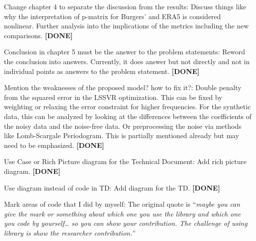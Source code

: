 \documentclass[a4paper,12pt]{scrreprt}
\begin{document}
\begin{numdesc}
    \item[Change chapter 4 to separate the discussion from the results:] Discuss things like why the interpretation of p-matrix for Burgers' and ERA5 is considered nonlinear. Further analysis into the implications of the metrics including the new comparisons. \textbf{[DONE]}
    \item[Conclusion in chapter 5 must be the answer to the problem statements:] Reword the conclusion into answers. Currently, it does answer but not directly and not in individual points as answers to the problem statement. \textbf{[DONE]}
    \item[Mention the weaknesses of the proposed model? how to fix it?:] Double penalty from the squared error in the LSSVR optimization. This can be fixed by weighting or relaxing the error constraint for higher frequencies. For the synthetic data, this can be analyzed by looking at the differences between the coefficients of the noisy data and the noise-free data. Or preprocessing the noise via methods like Lomb-Scargale Periodogram. This is partially mentioned already but may need to be emphasized. \textbf{[DONE]}
    \item[Use Case or Rich Picture diagram for the Technical Document:] Add rich picture diagram. \textbf{[DONE]}
    \item[Use diagram instead of code in TD:] Add diagram for the TD\@. \textbf{[DONE]}
    \item[Mark areas of code that I did by myself:] The original quote is \enquote{\emph{maybe you can give the mark or something about which one you use the library and which one you code by yourself\ldots{} so you can show your contribution. The challenge of using library is show the researcher contribution.}}


\end{numdesc}
\end{document}
